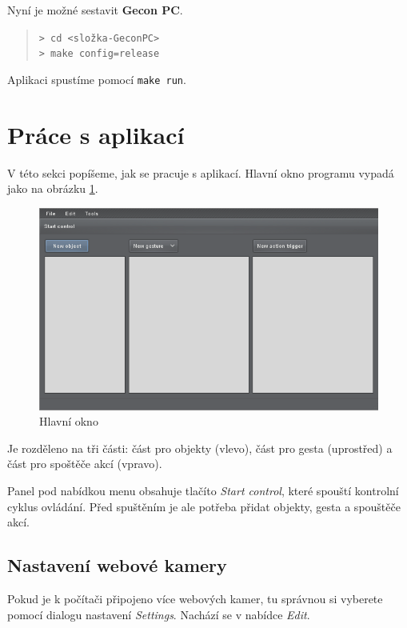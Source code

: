 \bigskip
Nyní je možné sestavit \textbf{Gecon PC}.
\begin{quote}
\texttt{> cd <složka-GeconPC>}\\
\texttt{> make config=release}
\end{quote}

Aplikaci spustíme pomocí \texttt{make run}.

\section{Práce s aplikací}
V této sekci popíšeme, jak se pracuje s aplikací. Hlavní okno programu vypadá
jako na obrázku \ref{fig:mainwindow}.

\begin{figure}[h]
\centering
\includegraphics[width=\textwidth]{mainwindow.png}
\caption{Hlavní okno}
\label{fig:mainwindow}
\end{figure}

Je rozděleno na tři části: část pro objekty (vlevo), část pro gesta
(uprostřed) a část pro spoštěče akcí (vpravo).

Panel pod nabídkou menu obsahuje tlačíto \emph{Start control}, které spouští
kontrolní cyklus ovládání. Před spuštěním je ale potřeba přidat objekty, gesta
a spouštěče akcí.

\subsection{Nastavení webové kamery}
Pokud je k počítači připojeno více webových kamer, tu správnou si vyberete
pomocí dialogu nastavení \emph{Settings}. Nachází se v nabídce \emph{Edit}.

